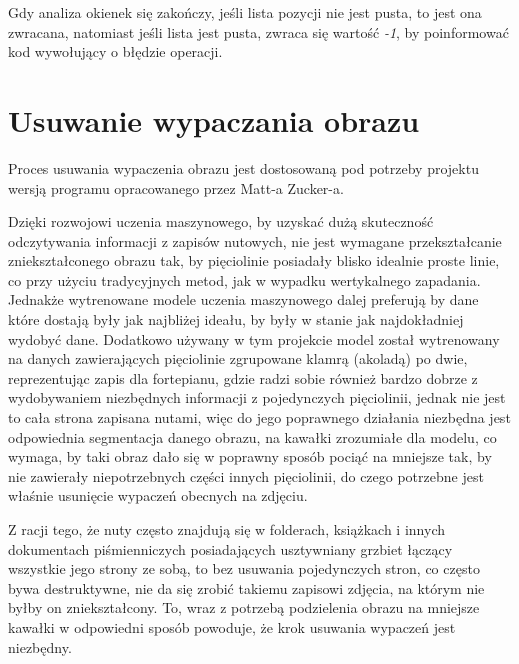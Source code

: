 Gdy analiza okienek się zakończy, jeśli lista pozycji nie jest pusta, to jest ona zwracana, natomiast jeśli lista jest pusta, zwraca się wartość \textit{-1}, by poinformować kod wywołujący o błędzie operacji.

\section{Usuwanie wypaczania obrazu}

Proces usuwania wypaczenia obrazu jest dostosowaną pod potrzeby projektu wersją programu opracowanego przez Matt-a Zucker-a.

Dzięki rozwojowi uczenia maszynowego, by uzyskać dużą skuteczność odczytywania informacji z zapisów nutowych, nie jest wymagane przekształcanie zniekształconego obrazu tak, by pięciolinie posiadały blisko idealnie proste linie, co przy użyciu tradycyjnych metod, jak w wypadku wertykalnego zapadania. Jednakże wytrenowane modele uczenia maszynowego dalej preferują by dane które dostają były jak najbliżej ideału, by były w stanie jak najdokładniej wydobyć dane. Dodatkowo używany w tym projekcie model został wytrenowany na danych zawierających pięciolinie zgrupowane klamrą (akoladą) po dwie, reprezentując zapis dla fortepianu, gdzie radzi sobie również bardzo dobrze z wydobywaniem niezbędnych informacji z pojedynczych pięciolinii, jednak nie jest to cała strona zapisana nutami, więc do jego poprawnego działania niezbędna jest odpowiednia segmentacja danego obrazu, na kawałki zrozumiałe dla modelu, co wymaga, by taki obraz dało się w poprawny sposób pociąć na mniejsze tak, by nie zawierały niepotrzebnych części innych pięciolinii, do czego potrzebne jest właśnie usunięcie wypaczeń obecnych na zdjęciu.

Z racji tego, że nuty często znajdują się w folderach, książkach i innych dokumentach piśmienniczych posiadających usztywniany grzbiet łączący wszystkie jego strony ze sobą, to bez usuwania pojedynczych stron, co często bywa destruktywne, nie da się zrobić takiemu zapisowi zdjęcia, na którym nie byłby on zniekształcony. To, wraz z potrzebą podzielenia obrazu na mniejsze kawałki w odpowiedni sposób powoduje, że krok usuwania wypaczeń jest niezbędny.



